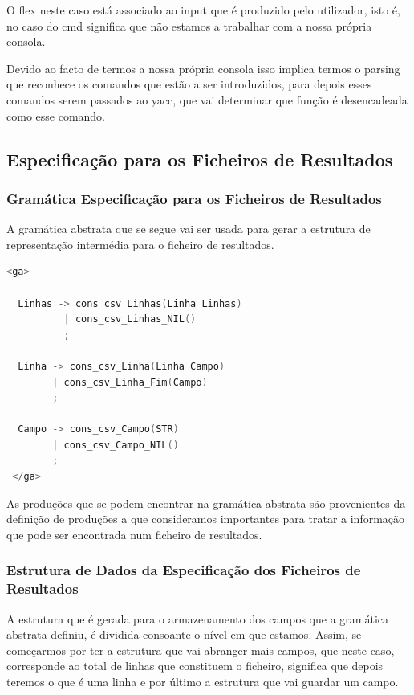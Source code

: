 \documentclass[11pt, a4paper, oneside]{article}
\begin{document}
O \textsf{flex} neste caso está associado ao input que é produzido pelo utilizador, isto é, no caso do cmd significa que não estamos a trabalhar com a nossa própria consola.

Devido ao facto de termos a nossa própria consola isso implica termos o parsing que reconhece os comandos que estão a ser introduzidos, para depois esses comandos serem passados ao \textsf{yacc}, que vai determinar que função é desencadeada como esse comando.

\subsection{Especificação para os Ficheiros de Resultados}

\subsubsection{Gramática Especificação para os Ficheiros de Resultados}

A gramática abstrata que se segue vai ser usada para gerar a estrutura de representação intermédia para o ficheiro de resultados.

\begin{lstlisting}[language=C, caption={Gramática para a linguagem de especificação para os ficheiros de resultados.}]
<ga>
  
  Linhas -> cons_csv_Linhas(Linha Linhas)
          | cons_csv_Linhas_NIL()
          ;

  Linha -> cons_csv_Linha(Linha Campo)
        | cons_csv_Linha_Fim(Campo)
        ;

  Campo -> cons_csv_Campo(STR)
        | cons_csv_Campo_NIL()
        ;
 </ga>
\end{lstlisting}

As produções que se podem encontrar na gramática abstrata são provenientes da definição de produções a que consideramos importantes para tratar a informação que pode ser encontrada num ficheiro de resultados.

\subsubsection{Estrutura de Dados da Especificação dos Ficheiros de Resultados}

A estrutura que é gerada para o armazenamento dos campos que a gramática abstrata definiu, é dividida consoante o nível em que estamos. Assim, se começarmos por ter a estrutura que vai abranger mais campos, que neste caso, corresponde ao total de linhas que constituem o ficheiro, significa que depois teremos o que é uma linha e por último a estrutura que vai guardar um campo.
\end{document}
